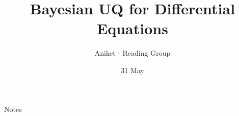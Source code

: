 \documentclass[usenames,dvipsnames]{beamer}
\title[Seminar]{Bayesian UQ for Differential Equations}
\author[AJ]{Aniket - Reading Group}
\institute[U-M]{University of Michigan}
\date{31 May}
\theoremstyle{definition}
\let\oldcite=\cite
\renewcommand{\cite}[2][]{\textcolor{green}{\oldcite[#1]{#2}}}
\begin{document}
\begin{frame}
\titlepage %
\end{frame}


\begin{frame}{Notes}
\end{frame}











\end{document}
